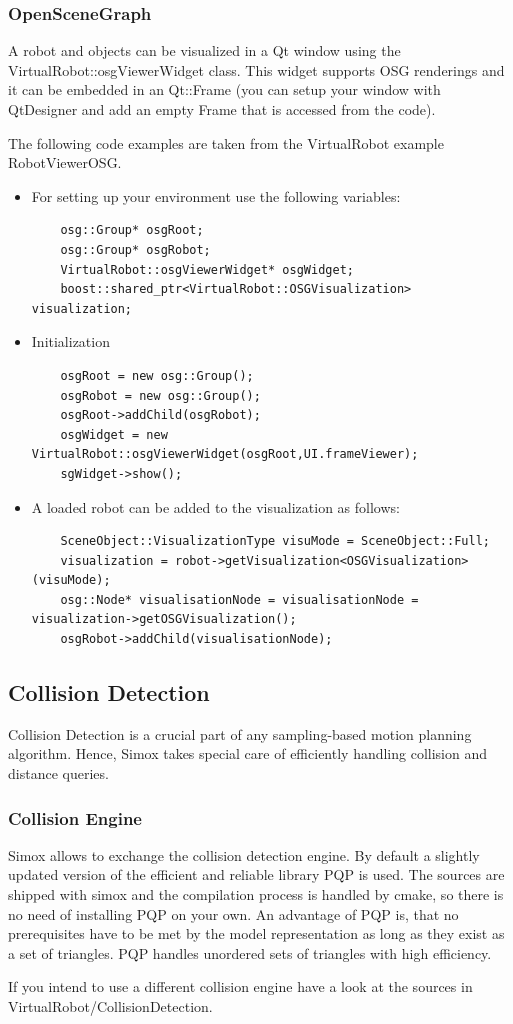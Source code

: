 \subsubsection{OpenSceneGraph}
A robot and objects can be visualized in a Qt window using the VirtualRobot::osgViewerWidget class. This widget supports OSG renderings and it can be embedded in an Qt::Frame (you can setup your window with QtDesigner and add an empty Frame that is accessed from the code).
\par
The following code examples are taken from the VirtualRobot example RobotViewerOSG. 
\begin{itemize}
\item For setting up your environment use the following variables: 
\begin{lstlisting}
    osg::Group* osgRoot;     
    osg::Group* osgRobot;
    VirtualRobot::osgViewerWidget* osgWidget;
    boost::shared_ptr<VirtualRobot::OSGVisualization> visualization;
\end{lstlisting}
\item Initialization 
\begin{lstlisting}
    osgRoot = new osg::Group();
    osgRobot = new osg::Group();
    osgRoot->addChild(osgRobot);
    osgWidget = new VirtualRobot::osgViewerWidget(osgRoot,UI.frameViewer);
    sgWidget->show();
\end{lstlisting}
\item A loaded robot can be added to the visualization as follows: 
\begin{lstlisting}
    SceneObject::VisualizationType visuMode = SceneObject::Full;
    visualization = robot->getVisualization<OSGVisualization>(visuMode);
    osg::Node* visualisationNode = visualisationNode = visualization->getOSGVisualization();
    osgRobot->addChild(visualisationNode);
\end{lstlisting}
\end{itemize}
\subsection{Collision Detection}
Collision Detection is a crucial part of any sampling-based motion planning algorithm. Hence, Simox takes special care of efficiently handling collision and distance queries. 
\par
\subsubsection{Collision Engine}
\par
Simox allows to exchange the collision detection engine. By default a slightly updated version of the efficient and reliable library PQP is used. The sources are shipped with simox and the compilation process is handled by cmake, so there is no need of installing PQP on your own. An advantage of PQP is, that no prerequisites have to be met by the model representation as long as they exist as a set of triangles. PQP handles unordered sets of triangles with high efficiency.
\par
If you intend to use a different collision engine have a look at the sources in VirtualRobot/CollisionDetection. 
\par
